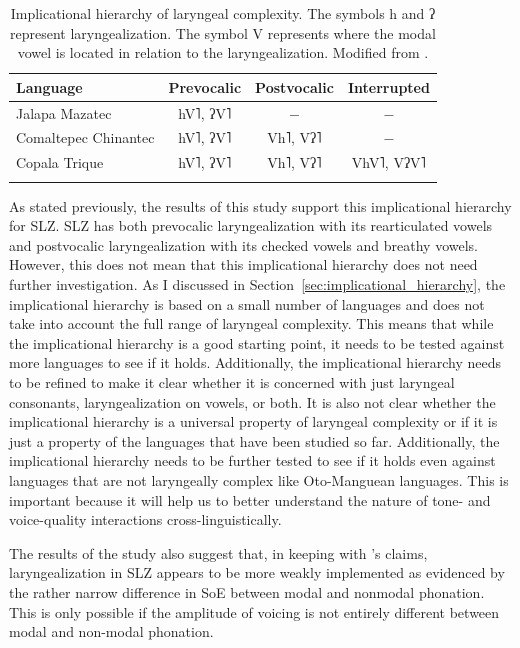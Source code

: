 \begin{table}[h!]
    \centering
    \caption{Implicational hierarchy of laryngeal complexity. The symbols h and ʔ represent laryngealization. The symbol V represents where the modal vowel is located in relation to the laryngealization.  Modified from \citet{silvermanLaryngealComplexityOtomanguean1997}.} 
    \label{tab:implicational_hierarchy_repeat}
    \begin{tabular}{lccc}
        \lsptoprule
        \textbf{Language} & \textbf{Prevocalic} & \textbf{Postvocalic} & \textbf{Interrupted} \\
        \hline 
        Jalapa Mazatec & hV˥, ʔV˥ & $-$ & $-$ \\
        Comaltepec Chinantec & hV˥, ʔV˥ & Vh˥, Vʔ˥ & $-$ \\
        Copala Trique & hV˥, ʔV˥ & Vh˥, Vʔ˥ & VhV˥, VʔV˥ \\
        \lspbottomrule
    \end{tabular}
\end{table}

As stated previously, the results of this study support this implicational hierarchy for SLZ. SLZ has both prevocalic laryngealization with its rearticulated vowels and postvocalic laryngealization with its checked vowels and breathy vowels. However, this does not mean that this implicational hierarchy does not need further investigation. As I discussed in Section~\ref{sec:implicational_hierarchy}, the implicational hierarchy is based on a small number of languages and does not take into account the full range of laryngeal complexity. This means that while the implicational hierarchy is a good starting point, it needs to be tested against more languages to see if it holds. Additionally, the implicational hierarchy needs to be refined to make it clear whether it is concerned with just laryngeal consonants, laryngealization on vowels, or both. It is also not clear whether the implicational hierarchy is a universal property of laryngeal complexity or if it is just a property of the languages that have been studied so far. Additionally, the implicational hierarchy needs to be further tested to see if it holds even against languages that are not laryngeally complex like Oto-Manguean languages. This is important because it will help us to better understand the nature of tone- and voice-quality interactions cross-linguistically.

The results of the study also suggest that, in keeping with \citeauthor{silvermanLaryngealComplexityOtomanguean1997}'s \citeyear{silvermanLaryngealComplexityOtomanguean1997} claims, laryngealization in SLZ appears to be more weakly implemented as evidenced by the rather narrow difference in SoE between modal and nonmodal phonation. This is only possible if the amplitude of voicing is not entirely different between modal and non-modal phonation.

